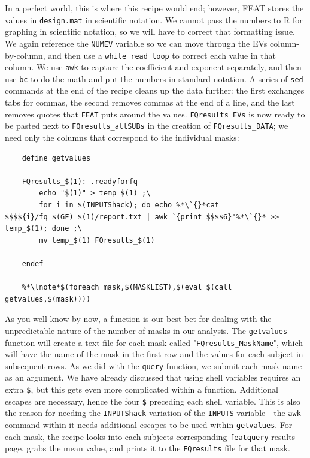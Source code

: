 In a perfect world, this is where this recipe would end; however, FEAT stores the values in \texttt{design.mat} in scientific notation. We cannot pass the numbers to R for graphing in scientific notation, so we will have to correct that formatting issue.  We again reference the \texttt{NUMEV} variable so we can move through the EVs column-by-column, and then use a \texttt{while read loop} to correct each value in that column. We use \texttt{awk} to capture the coefficient and exponent separately, and  then use \texttt{bc} to do the math and put the numbers in standard notation. A series of \texttt{sed} commands at the end of the recipe cleans up the data further: the first exchanges tabs for commas, the second removes commas at the end of a line, and the last removes quotes that \texttt{FEAT} puts around the values. \texttt{FQresults_EVs} is now ready to be pasted next to \texttt{FQresults_allSUBs} in the creation of \texttt{FQresults_DATA}; we need only the columns that correspond to the individual masks:
\begin{lstlisting}
	define getvalues
	
	FQresults_$(1): .readyforfq
		echo "$(1)" > temp_$(1) ;\
		for i in $(INPUTShack); do echo %*\`{}*cat $$$${i}/fq_$(GF)_$(1)/report.txt | awk `{print $$$$6}'%*\`{}* >> temp_$(1); done ;\
		mv temp_$(1) FQresults_$(1)
		
	endef
	
	%*\lnote*$(foreach mask,$(MASKLIST),$(eval $(call getvalues,$(mask))))
\end{lstlisting}
As you well know by now, a function is our best bet for dealing with the unpredictable nature of the number of masks in our analysis. The \texttt{getvalues} function will create a text file for each mask called "\texttt{FQresults_MaskName}", which will have the name of the mask in the first row and the values for each subject in subsequent rows. As we did with the \texttt{query} function, we submit each mask name as an argument. We have already discussed that using shell variables requires an extra \texttt{\$}, but this gets even more complicated within a function. Additional escapes are necessary, hence the four \texttt{\$} preceding each shell variable.  This is also the reason for needing the \texttt{INPUTShack} variation of the \texttt{INPUTS} variable - the \texttt{awk} command within it needs additional escapes to be used within \texttt{getvalues}. For each mask, the recipe looks into each subjects corresponding \texttt{featquery} results page, grabs the mean value, and prints it to the \texttt{FQresults} file for that mask.

